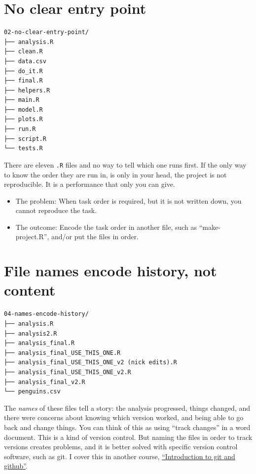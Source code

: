 \documentclass[
  letterpaper,
  justified,
  a4paper]{tufte-book}
\providecommand{\tightlist}{%
  \setlength{\itemsep}{0pt}\setlength{\parskip}{0pt}}
\providecommand{\tightlist}{%
  \setlength{\itemsep}{0pt}\setlength{\parskip}{0pt}}
\begin{document}
\section{No clear entry point}\label{no-clear-entry-point}

\begin{verbatim}
02-no-clear-entry-point/
├── analysis.R
├── clean.R
├── data.csv
├── do_it.R
├── final.R
├── helpers.R
├── main.R
├── model.R
├── plots.R
├── run.R
├── script.R
└── tests.R
\end{verbatim}

There are eleven \texttt{.R} files and no way to tell which one runs
first. If the only way to know the order they are run in, is only in
your head, the project is not reproducible. It is a performance that
only you can give.

\begin{itemize}
\tightlist
\item
  The problem: When task order is required, but it is not written down,
  you cannot reproduce the task.
\item
  The outcome: Encode the task order in another file, such as
  ``make-project.R'', and/or put the files in order.
\end{itemize}

\section{File names encode history, not
content}\label{file-names-encode-history-not-content}

\begin{verbatim}
04-names-encode-history/
├── analysis.R
├── analysis2.R
├── analysis_final.R
├── analysis_final_USE_THIS_ONE.R
├── analysis_final_USE_THIS_ONE_v2 (nick edits).R
├── analysis_final_USE_THIS_ONE_v2.R
├── analysis_final_v2.R
└── penguins.csv
\end{verbatim}

The \emph{names} of these files tell a story: the analysis progressed,
things changed, and there were concerns about knowing which version
worked, and being able to go back and change things. You can think of
this as using ``track changes'' in a word document. This is a kind of
version control. But naming the files in order to track versions creates
problems, and it is better solved with specific version control
software, such as git. I cover this in another course,
\href{https://gentle-git.njtierney.com/}{``Introduction to git and
github''}.
\end{document}
